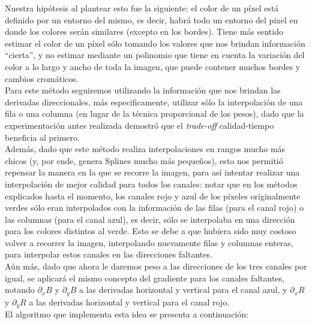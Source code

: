 \documentclass[a4paper]{article}
\begin{document}
Nuestra hipótesis al plantear esto fue la siguiente: el color de un píxel está definido por un entorno del mismo, es decir, habrá todo un entorno del pixel en donde los colores serán similares (excepto en los bordes). Tiene más sentido estimar el color de un píxel sólo tomando los valores que nos brindan información ``cierta'', y no estimar mediante un polinomio que tiene en cuenta la variación del color a lo largo y ancho de toda la imagen, que puede contener muchos bordes y cambios cromáticos. \\

Para este método seguiremos utilizando la información que nos brindan las derivadas direccionales, más especificamente, utilizar sólo la interpolación de una fila o una columna (en lugar de la técnica proporcional de los pesos), dado que la experimentación antes realizada demostró que el \textit{trade-off} calidad-tiempo beneficia al primero. \\

Además, dado que este método realiza interpolaciones en rangos mucho más chicos (y, por ende, genera Splines mucho más pequeños), esto nos permitió repensar la manera en la que se recorre la imagen, para así intentar realizar una interpolación de mejor calidad para todos los canales: notar que en los métodos explicados hasta el momento, los canales rojo y azul de los píxeles originalmente verdes sólo eran interpolados con la información de las filas (para el canal rojo) o las columnas (para el canal azul), es decir, sólo se interpolaba en una dirección para los colores distintos al verde. Esto se debe a que hubiera sido muy costoso volver a recorrer la imagen, interpolando nuevamente filas y columnas enteras, para interpolar estos canales en las direcciones faltantes.\\

Aún más, dado que ahora le daremos peso a las direcciones de los tres canales por igual, se aplicará el mismo concepto del gradiente para los canales faltantes, notando \(\partial_xB\) y \(\partial_yB\) a las derivadas horizontal y vertical para el canal azul, y \(\partial_xR\) y \(\partial_yR\) a las derivadas horizontal y vertical para el canal rojo.\\

El algoritmo que implementa esta idea se presenta a continuación:
\pagebreak
\end{document}
